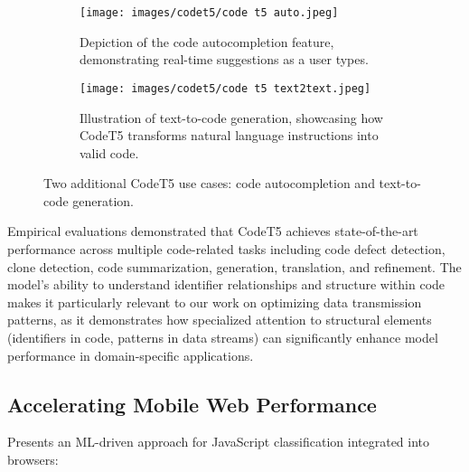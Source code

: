 \documentclass[a4paper, 11pt, twoside, openright]{report}
\begin{document}
\begin{figure}[ht]
    \centering
    \begin{subfigure}{0.45\textwidth}
        \centering
        \texttt{[image: images/codet5/code t5 auto.jpeg]}
        \caption{Depiction of the code autocompletion feature, demonstrating real-time suggestions as a user types.}
        \label{fig:codeT5-auto}
    \end{subfigure}
    \hfill
    \begin{subfigure}{0.45\textwidth}
        \centering
        \texttt{[image: images/codet5/code t5 text2text.jpeg]}
        \caption{Illustration of text-to-code generation, showcasing how CodeT5 transforms natural language instructions into valid code.}
        \label{fig:codeT5-text2code}
    \end{subfigure}
    \caption{Two additional CodeT5 use cases: code autocompletion and text-to-code generation.}
    \label{fig:figure2}
\end{figure}

Empirical evaluations demonstrated that CodeT5 achieves state-of-the-art performance across multiple code-related tasks including code defect detection, clone detection, code summarization, generation, translation, and refinement. The model's ability to understand identifier relationships and structure within code makes it particularly relevant to our work on optimizing data transmission patterns, as it demonstrates how specialized attention to structural elements (identifiers in code, patterns in data streams) can significantly enhance model performance in domain-specific applications.

\subsection{Accelerating Mobile Web Performance}
Presents an ML-driven approach for JavaScript classification integrated into browsers:
\end{document}
